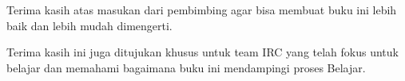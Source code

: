 Terima kasih atas masukan dari pembimbing agar bisa membuat buku ini 
lebih baik dan lebih mudah dimengerti.

Terima kasih ini juga ditujukan khusus untuk team IRC yang 
telah fokus untuk belajar dan memahami bagaimana buku ini mendampingi proses 
Belajar.
